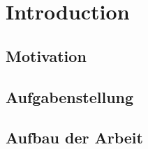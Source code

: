 \chapter{Introduction}

\section{Motivation}
\section{Aufgabenstellung}
\section{Aufbau der Arbeit}

